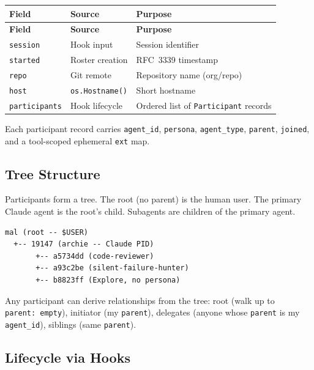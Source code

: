 \documentclass[a4paper,10pt]{article}
\newcommand{\field}[1]{\texttt{#1}}
\begin{document}
\begin{center}
\begin{longtable}{@{}llp{5cm}@{}}
\toprule
\textbf{Field} & \textbf{Source} & \textbf{Purpose} \\
\midrule
\endfirsthead
\toprule
\textbf{Field} & \textbf{Source} & \textbf{Purpose} \\
\midrule
\endhead
\field{session}      & Hook input        & Session identifier \\
\field{started}      & Roster creation   & RFC~3339 timestamp \\
\field{repo}         & Git remote        & Repository name
                                           (org/repo) \\
\field{host}         & \texttt{os.Hostname()} & Short hostname \\
\field{participants} & Hook lifecycle    & Ordered list of
                                           \texttt{Participant}
                                           records \\
\bottomrule
\end{longtable}
\end{center}

Each participant record carries \field{agent\_id}, \field{persona},
\field{agent\_type}, \field{parent}, \field{joined}, and a
tool-scoped ephemeral \field{ext} map.

\subsection{Tree Structure}

Participants form a tree.  The root (no parent) is the human user.
The primary Claude agent is the root's child.  Subagents are children
of the primary agent.

\begin{verbatim}
mal (root -- $USER)
  +-- 19147 (archie -- Claude PID)
       +-- a5734dd (code-reviewer)
       +-- a93c2be (silent-failure-hunter)
       +-- b8823ff (Explore, no persona)
\end{verbatim}

Any participant can derive relationships from the tree: root (walk up
to \field{parent:~empty}), initiator (my \field{parent}), delegates
(anyone whose \field{parent} is my \field{agent\_id}), siblings (same
\field{parent}).

\subsection{Lifecycle via Hooks}
\end{document}
